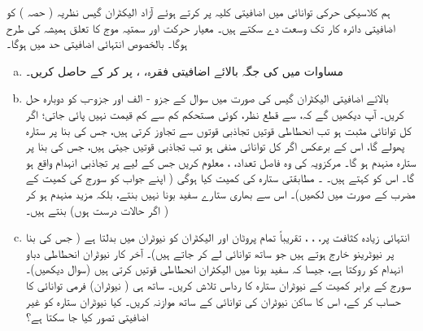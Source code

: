 ہم کلاسیکی حرکی توانائی  میں اضافیتی کلیہ  پر کرتے ہوئے آزاد الیکٹران گیس نظریہ ( حصہ ) کو اضافیتی دائرہ کار تک وسعت دے سکتے ہیں۔ معیار حرکت اور سمتیہ موج کا تعلق ہمیشہ کی طرح  ہوگا۔ بالخصوص انتہائی اضافیتی حد میں  ہوگا۔ 
\begin{enumerate}[a.]
\item
مساوات  میں  کی جگہ بالائے اضافیتی فقرہ، ، پر کر کے  حاصل کریں۔
\item
بالائے اضافیتی الیکٹران گیس کی صورت میں سوال  کے جزو - الف اور جزو-ب کو دوبارہ حل کریں۔ آپ دیکھیں گے کہ،  سے قطع نظر، کوئی مستحکم کم سے کم قیمت نہیں پائی جاتی؛ اگر کل توانائی مثبت ہو تب انحطاطی قوتیں تجاذبی قوتوں سے تجاوز کرتی ہیں، جس کی بنا پر ستارہ پھولے گا، اس کے برعکس اگر کل توانائی منفی ہو تب تجاذبی قوتيں جیتی ہیں، جس کی بنا پر ستارہ منہدم ہو گا۔ مرکزویہ کی وہ فاصل تعداد، ، معلوم کریں جس کے لیے  پر تجاذبی انہدام واقع ہو گا۔ اس کو  کہتے ہیں۔  ۔ مطابقتی ستارہ کی کمیت کیا ہوگی ( اپنے جواب کو سورج کی کمیت کے مضرب کے صورت میں لکھیں)۔ اس سے بھاری ستارے سفید بونا نہیں بنتے، بلکہ مزید منہدم ہو کر ( اگر حالات درست ہوں)  بنتے ہیں۔
\item
انتہائی زیادہ کثافت پر، ، ، تقریباً تمام پروٹان اور الیکٹران کو نیوٹران میں بدلتا ہے ( جس کی بنا پر نیوٹرینو خارج ہوتے ہیں جو ساتھ توانائی لے کر جاتے ہیں)۔ آخر کار نیوٹران انحطاطی دباو انہدام کو روکتا ہے، جیسا کہ سفید بونا میں الیکٹران انحطاطی قوتیں کرتی ہیں (سوال  دیکھیں)۔ سورج کے برابر کمیت کے نیوٹران ستارہ کا رداس تلاش کریں۔ ساتھ ہی ( نیوٹران) فرمی توانائی کا حساب کر کے، اس کا ساکن نیوٹران کی توانائی کے ساتھ موازنہ کریں۔ کیا نیوٹران ستارہ کو غیر اضافیتی تصور کیا جا سکتا ہے؟ 
\end{enumerate}
